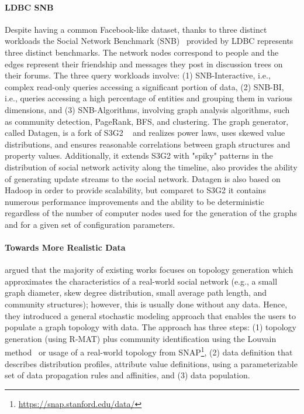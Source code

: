 \paragraph{LDBC SNB} Despite having a common Facebook-like dataset, thanks to
three distinct workloads the Social Network Benchmark
(SNB)~\cite{Erling:2015:LSN:2723372.2742786} provided by LDBC represents three
distinct benchmarks. The network nodes correspond to people and the edges
represent their friendship and messages they post in discussion trees on their
forums. The three query workloads involve: (1) SNB-Interactive, i.e., complex
read-only queries accessing a significant portion of data, (2) SNB-BI, i.e.,
queries accessing a high percentage of  entities and grouping them in various
dimensions, and (3) SNB-Algorithms, involving graph analysis algorithms, such as
community detection, PageRank, BFS, and clustering. The graph generator, called
Datagen, is a fork of S3G2 ~\cite{Pham2013} and realizes power laws, uses skewed
value distributions, and ensures reasonable correlations between graph
structures and property values. Additionally, it extends S3G2 with "spiky"
patterns in the distribution of social network activity along the timeline, also
provides the ability of generating update streams to the social network. Datagen
is also based on Hadoop in order to provide scalability, but comparet to S3G2 it
contains numerous performance improvements and the ability to be deterministic
regardless of the number of computer nodes used for the generation of the graphs
and for a given set of configuration parameters.


\paragraph{Towards More Realistic Data} \cite{Nettleton2016} argued that the majority of existing works focuses on
topology generation which approximates the characteristics of a real-world social
network (e.g., a small graph diameter, skew degree
distribution, small average path length, and community structures); however,  this is usually done without any data. Hence, they
introduced a general stochastic modeling approach that enables the users to
populate a graph topology with data. The approach has three steps: (1) topology
generation (using R-MAT) plus community identification using the Louvain
method~\cite{1742-5468-2008-10-P10008} or usage of a real-world topology from
SNAP\footnote{\url{https://snap.stanford.edu/data/}}, (2) data definition
that describes distribution profiles, attribute value definitions, using a
parameterizable set of data propagation rules and affinities, and (3) data
population.

